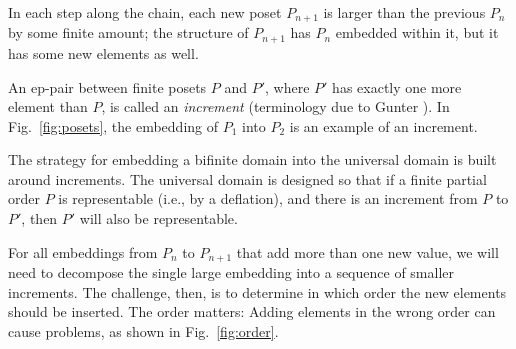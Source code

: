 In each step along the chain, each new poset $P_{n+1}$ is larger than the previous $P_n$ by some finite amount; the structure of $P_{n+1}$ has $P_n$ embedded within it, but it has some new elements as well.

An ep-pair between finite posets $P$ and $P'$, where $P'$ has exactly one more element than $P$, is called an \emph{increment} (terminology due to Gunter \cite{gunter92semantics}). In Fig.~\ref{fig:posets}, the embedding of $P_1$ into $P_2$ is an example of an increment.

The strategy for embedding a bifinite domain into the universal domain is built around increments. The universal domain is designed so that if a finite partial order $P$ is representable (i.e., by a deflation), and there is an increment from $P$ to $P'$, then $P'$ will also be representable.

For all embeddings from $P_n$ to $P_{n+1}$ that add more than one new value, we will need to decompose the single large embedding into a sequence of smaller increments. The challenge, then, is to determine in which order the new elements should be inserted. The order matters: Adding elements in the wrong order can cause problems, as shown in Fig.~\ref{fig:order}.

